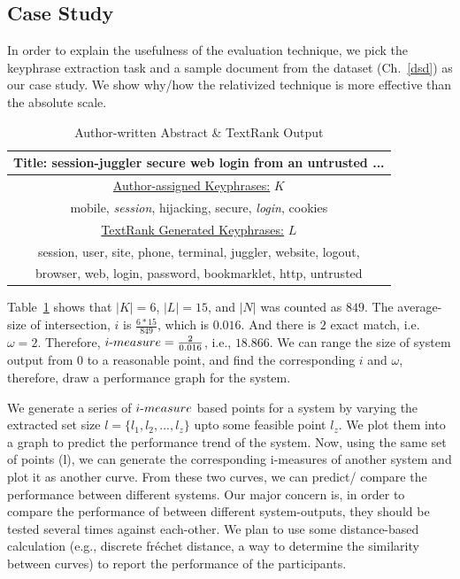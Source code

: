 \documentclass[a4paper]{report}
\begin{document}
\subsection{Case Study}
In order to explain the usefulness of the evaluation technique, we pick the keyphrase extraction task and a sample document from the dataset (Ch.~\ref{dsd}) as our case study. We show why/how the relativized technique is more effective than the absolute scale. 
\begin{table}[H]
\centering
\begin{tabular}{c} 
\toprule
Title: session-juggler secure web login from an untrusted ...\\\midrule
\underline{Author-assigned Keyphrases:} $K$\\
mobile, {\it session}, hijacking, secure, {\it login}, cookies\\\midrule
\underline{TextRank Generated Keyphrases:} $L$\\
session, user, site, phone, terminal, juggler, website, logout,\\
browser, web, login, password, bookmarklet, http, untrusted\\
\bottomrule
\end{tabular}
\caption{Author-written Abstract \& TextRank Output}
\label{keTable}
\end{table}
\par Table~\ref{keTable} shows that $|K| = 6$, $|L| = 15$, and $|N|$ was counted as $849$. The average-size of intersection, $i$ is $\frac{6 * 15}{849}$, which is $0.016$. And there is $2$ exact match, i.e. $\omega = 2$.
Therefore, $i\hbox{-}measure = \frac{2}{0.016}$, i.e., $18.866$. We can range the size of system output from $0$ to a reasonable point, and find the corresponding $i$ and $\omega$, therefore, draw a performance graph for the system. 
\par We generate a series of $i\hbox{-}measure$ based points for a system by varying the extracted set size $l = \{l_1,l_2,...,l_z\}$ upto some feasible point $l_z$. We plot them into a graph to predict the performance trend of the system. Now, using the same set of points (l), we can generate the corresponding i-measures of another system and plot it as another curve. From these two curves, we can predict/ compare the performance between different systems. Our major concern is, in order to compare the performance of between different system-outputs, they should be tested several times against each-other. We plan to use some distance-based calculation (e.g., discrete fr\'echet distance, a way to determine the similarity between curves) to report the performance of the participants.\\
\end{document}
